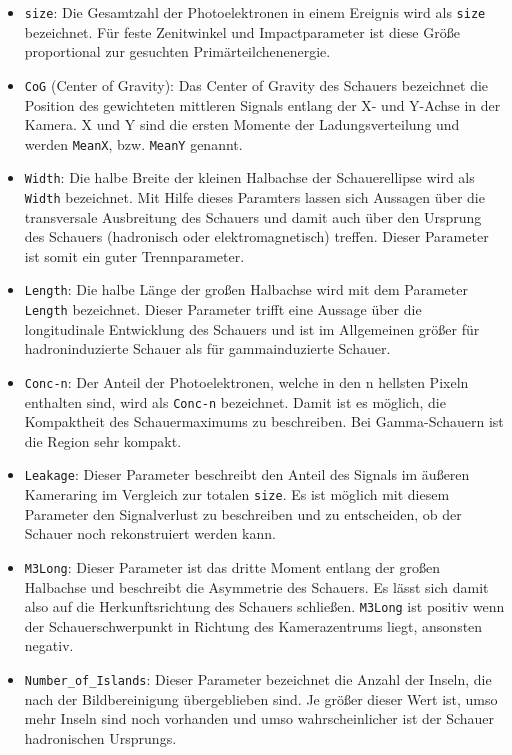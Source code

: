 \begin{itemize}
 \item \texttt{size}: Die Gesamtzahl der Photoelektronen in einem Ereignis wird als \texttt{size} bezeichnet. Für feste Zenitwinkel und Impactparameter ist diese Größe proportional zur gesuchten Primärteilchenenergie.
 \item \texttt{CoG} (Center of Gravity): Das Center of Gravity des Schauers bezeichnet die Position des gewichteten mittleren Signals entlang der X- und Y-Achse in der Kamera. 
 X und Y sind die ersten Momente der Ladungsverteilung und werden \texttt{MeanX}, bzw. \texttt{MeanY} genannt.
 \item \texttt{Width}: Die halbe Breite der kleinen Halbachse der Schauerellipse wird als \texttt{Width} bezeichnet. 
 Mit Hilfe dieses Paramters lassen sich Aussagen über die transversale Ausbreitung des Schauers und damit auch über den Ursprung des Schauers (hadronisch oder elektromagnetisch) treffen. 
 Dieser Parameter ist somit ein guter Trennparameter.
 \item \texttt{Length}: Die halbe Länge der großen Halbachse wird mit dem Parameter \texttt{Length} bezeichnet.
 Dieser Parameter trifft eine Aussage über die longitudinale Entwicklung des Schauers und ist im Allgemeinen größer für hadroninduzierte Schauer als für gammainduzierte Schauer.
 \item \texttt{Conc-n}: Der Anteil der Photoelektronen, welche in den n hellsten Pixeln enthalten sind, wird als \texttt{Conc-n} bezeichnet.
 Damit ist es möglich, die Kompaktheit des Schauermaximums zu beschreiben. 
 Bei Gamma-Schauern ist die Region sehr kompakt.
 \item \texttt{Leakage}: Dieser Parameter beschreibt den Anteil des Signals im äußeren Kameraring im Vergleich zur totalen \texttt{size}.
 Es ist möglich mit diesem Parameter den Signalverlust zu beschreiben und zu entscheiden, ob der Schauer noch rekonstruiert werden kann.
 \item \texttt{M3Long}: Dieser Parameter ist das dritte Moment entlang der großen Halbachse und beschreibt die Asymmetrie des Schauers.
 Es lässt sich damit also auf die Herkunftsrichtung des Schauers schließen. 
 \texttt{M3Long} ist positiv wenn der Schauerschwerpunkt in Richtung des Kamerazentrums liegt, ansonsten negativ.
 \item \texttt{Number\_of\_Islands}: Dieser Parameter bezeichnet die Anzahl der Inseln, die nach der Bildbereinigung übergeblieben sind. 
 Je größer dieser Wert ist, umso mehr Inseln sind noch vorhanden und umso wahrscheinlicher ist der Schauer hadronischen Ursprungs.
\end{itemize}

